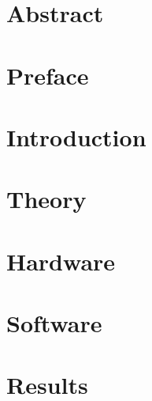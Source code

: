 \documentclass[a4paper]{report}
\begin{document}
\begin{titlepage}

\end{titlepage}

\clearpage
\chapter*{Abstract}


\clearpage
\chapter*{Preface}


\clearpage
\setlength{\columnseprule}{0.2pt}
\tableofcontents %
\thispagestyle{plain}
\vspace{0.5em}

\setlength{\parindent}{0pt}

\clearpage
\printglossary[type=\acronymtype,title=Abbrevations]
\thispagestyle{plain}


\clearpage
{}
\setcounter{page}{1}
\chapter{Introduction}


\clearpage
\chapter{Theory}\label{sec:Theory}


\clearpage
\chapter{Hardware}\label{sec:pcb}


\clearpage
\chapter{Software}\label{sec:software}


\clearpage
\chapter{Results}\label{sec:results}

\end{document}
